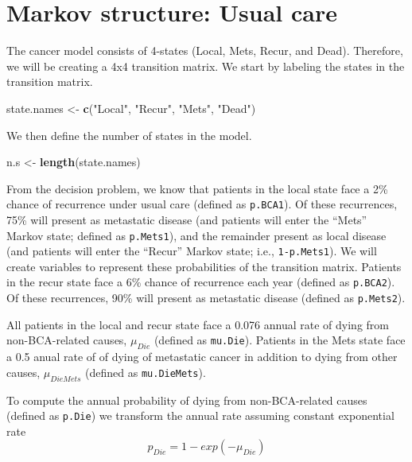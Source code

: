 \documentclass[]{article}
\newenvironment{Shaded}{\begin{snugshade}}{\end{snugshade}}
\newcommand{\KeywordTok}[1]{\textcolor[rgb]{0.13,0.29,0.53}{\textbf{#1}}}
\newcommand{\StringTok}[1]{\textcolor[rgb]{0.31,0.60,0.02}{#1}}
\newcommand{\NormalTok}[1]{#1}
\theoremstyle{definition}
\theoremstyle{definition}
\theoremstyle{definition}
\theoremstyle{remark}
\begin{document}
\section{Markov structure: Usual
care}\label{markov-structure-usual-care}

The cancer model consists of 4-states (Local, Mets, Recur, and Dead).
Therefore, we will be creating a 4x4 transition matrix. We start by
labeling the states in the transition matrix.

\begin{Shaded}
\begin{Highlighting}[]
\NormalTok{state.names <-}\StringTok{ }\KeywordTok{c}\NormalTok{(}\StringTok{"Local"}\NormalTok{, }\StringTok{"Recur"}\NormalTok{, }\StringTok{"Mets"}\NormalTok{, }\StringTok{"Dead"}\NormalTok{)}
\end{Highlighting}
\end{Shaded}

We then define the number of states in the model.

\begin{Shaded}
\begin{Highlighting}[]
\NormalTok{n.s <-}\StringTok{ }\KeywordTok{length}\NormalTok{(state.names)}
\end{Highlighting}
\end{Shaded}

From the decision problem, we know that patients in the local state face
a 2\% chance of recurrence under usual care (defined as
\texttt{p.BCA1}). Of these recurrences, 75\% will present as metastatic
disease (and patients will enter the ``Mets'' Markov state; defined as
\texttt{p.Mets1}), and the remainder present as local disease (and
patients will enter the ``Recur'' Markov state; i.e.,
\texttt{1-p.Mets1}). We will create variables to represent these
probabilities of the transition matrix. Patients in the recur state face
a 6\% chance of recurrence each year (defined as \texttt{p.BCA2}). Of
these recurrences, 90\% will present as metastatic disease (defined as
\texttt{p.Mets2}).

All patients in the local and recur state face a 0.076 annual rate of
dying from non-BCA-related causes, \(\mu_{Die}\) (defined as
\texttt{mu.Die}). Patients in the Mets state face a 0.5 anual rate of of
dying of metastatic cancer in addition to dying from other causes,
\(\mu_{DieMets}\) (defined as \texttt{mu.DieMets}).

To compute the annual probability of dying from non-BCA-related causes
(defined as \texttt{p.Die}) we transform the annual rate assuming
constant exponential rate \[
  p_{Die} = 1-exp(-\mu_{Die})
\]
\end{document}
